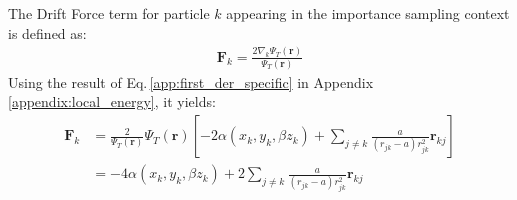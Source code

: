 The Drift Force term for particle $k$ appearing in the importance sampling context is defined as: 
\begin{align*}
    \bm{F}_k=\frac{2\nabla_k \Psi_T(\mathbf{r})}{\Psi_T(\mathbf{r})}
\end{align*}
Using the result of Eq.\,\ref{app:first_der_specific} in Appendix \ref{appendix:local_energy}, it yields: 
\begin{align*}
    \bm{F}_k &= \frac{2}{\Psi_T(\mathbf{r})}\Psi_T(\mathbf{r}) \left[ -2\alpha (x_k, y_k, \beta z_k) + \sum_{j\neq k} \frac{a}{\left( r_{jk} - a \right) r_{jk}^2} \mathbf{r}_{kj} \right] \\ 
     &=-4\alpha (x_k, y_k, \beta z_k) + 2\sum_{j\neq k} \frac{a}{\left( r_{jk} - a \right) r_{jk}^2} \mathbf{r}_{kj} 
\end{align*}
